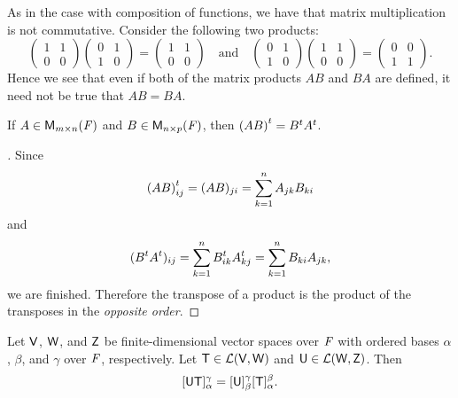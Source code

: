 \begin{note}
	As in the case with composition of functions, we have that matrix multiplication is not commutative. Consider the following two products:
	\[
		\begin{pmatrix}
			1 & 1 \\
			0 & 0
		\end{pmatrix} \begin{pmatrix}
			0 & 1 \\
			1 & 0
		\end{pmatrix} = \begin{pmatrix}
			1 & 1 \\
			0 & 0
		\end{pmatrix} \quad \text{and} \quad \begin{pmatrix}
			0 & 1 \\
			1 & 0
		\end{pmatrix} \begin{pmatrix}
			1 & 1 \\
			0 & 0
		\end{pmatrix} = \begin{pmatrix}
			0 & 0 \\
			1 & 1
		\end{pmatrix}.
	\]
	Hence we see that even if both of the matrix products \(AB\) and \(BA\) are defined, it need not be true that \(AB = BA\).
\end{note}

\begin{eg}\label{2.3.2}
	If \(A \in \ms\) and \(B \in \ms[n][p][\F]\), then \({(AB)}^{t} = {B}^{t} {A}^{t}\).
\end{eg}

\begin{proof}[]
	Since
	\[
		{(AB)}^{t}_{i j} = (AB)_{j i} = \sum_{k = 1}^n A_{j k} B_{k i}
	\]
	and
	\[
		({B}^{t} {A}^{t})_{i j} = \sum_{k = 1}^n {B}^{t}_{i k} {A}^{t}_{k j} = \sum_{k = 1}^n B_{k i} A_{j k},
	\]
	we are finished.
	Therefore the transpose of a product is the product of the transposes in the \emph{opposite order}.
\end{proof}

\begin{thm}\label{2.11}
	Let \(\mathsf{V}\), \(\mathsf{W}\), and \(\mathsf{Z}\) be finite-dimensional vector spaces over \(\mathit{F}\) with ordered bases \(\alpha\), \(\beta\), and \(\gamma\) over \(\mathit{F}\), respectively.
	Let \(\mathsf{T} \in \mathcal{L}(\mathsf{V}, \mathsf{W})\) and \(\mathsf{U} \in \mathcal{L}(\mathsf{W}, \mathsf{Z})\).
	Then
	\[
		[\mathsf{U} \mathsf{T}]_{\alpha}^{\gamma} = [\mathsf{U}]_{\beta}^{\gamma} [\mathsf{T}]_{\alpha}^{\beta}.
	\]
\end{thm}

